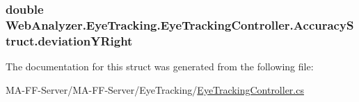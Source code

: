 \subsubsection[{deviation\+Y\+Right}]{\setlength{\rightskip}{0pt plus 5cm}double Web\+Analyzer.\+Eye\+Tracking.\+Eye\+Tracking\+Controller.\+Accuracy\+Struct.\+deviation\+Y\+Right}\label{struct_web_analyzer_1_1_eye_tracking_1_1_eye_tracking_controller_1_1_accuracy_struct_a1f188a004ecaf067028b9695647d0c7e}


The documentation for this struct was generated from the following file\+:\begin{DoxyCompactItemize}
\item 
M\+A-\/\+F\+F-\/\+Server/\+M\+A-\/\+F\+F-\/\+Server/\+Eye\+Tracking/\hyperlink{_eye_tracking_controller_8cs}{Eye\+Tracking\+Controller.\+cs}\end{DoxyCompactItemize}
